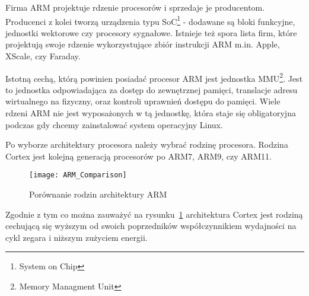 \par
Firma ARM projektuje rdzenie procesorów i sprzedaje je producentom. Producenci z kolei tworzą urządzenia typu SoC\footnote{System on Chip} - dodawane są bloki funkcyjne, jednostki wektorowe czy procesory sygnałowe. Istnieje też spora lista firm, które projektują swoje rdzenie wykorzystujące zbiór instrukcji ARM m.in. Apple, XScale, czy Faraday.

\par
Istotną cechą, którą powinien posiadać procesor ARM jest jednostka MMU\footnote{Memory Managment Unit}. Jest to jednostka odpowiadająca za dostęp do zewnętrznej pamięci, translacje adresu wirtualnego na fizyczny, oraz kontroli uprawnień dostępu do pamięci. Wiele rdzeni ARM nie jest wyposażonych w tą jednostkę, która staje się obligatoryjna podczas gdy chcemy zainstalować system operacyjny Linux. 
\par

Po wyborze architektury procesora należy wybrać rodzinę procesora. Rodzina Cortex jest kolejną generacją procesorów po ARM7, ARM9, czy ARM11.

\begin{figure}
\begin{center}
	\texttt{[image: ARM\_Comparison]}
\end{center}
\caption{Porównanie rodzin architektury ARM}
\label{fig:ARM_Comp}
\end{figure}

Zgodnie z tym co można zauważyć na rysunku~\ref{fig:ARM_Comp} architektura Cortex jest rodziną cechującą się wyższym od swoich poprzedników współczynnikiem wydajności na cykl zegara i niższym zużyciem energii.

